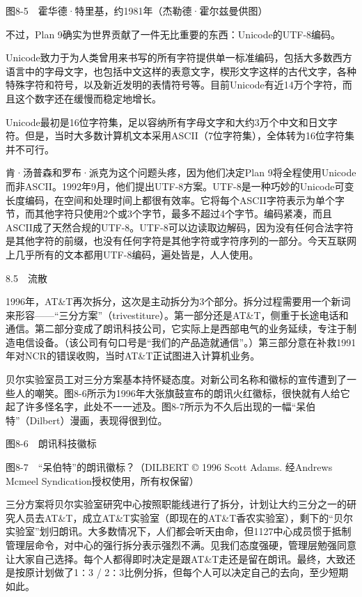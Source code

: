 \documentclass[a4paper,12pt,UTF8,twoside]{ctexbook}
\begin{document}
图8-5　霍华德·特里基，约1981年（杰勒德·霍尔兹曼供图）

不过，Plan 9确实为世界贡献了一件无比重要的东西：Unicode的UTF-8编码。

Unicode致力于为人类曾用来书写的所有字符提供单一标准编码，包括大多数西方语言中的字母文字，也包括中文这样的表意文字，楔形文字这样的古代文字，各种特殊字符和符号，以及新近发明的表情符号等。目前Unicode有近14万个字符，而且这个数字还在缓慢而稳定地增长。

Unicode最初是16位字符集，足以容纳所有字母文字和大约3万个中文和日文字符。但是，当时大多数计算机文本采用ASCII（7位字符集），全体转为16位字符集并不可行。

肯·汤普森和罗布·派克为这个问题头疼，因为他们决定Plan 9将全程使用Unicode而非ASCII。1992年9月，他们提出UTF-8方案。UTF-8是一种巧妙的Unicode可变长度编码，在空间和处理时间上都很有效率。它将每个ASCII字符表示为单个字节，而其他字符只使用2个或3个字节，最多不超过4个字节。编码紧凑，而且ASCII成了天然合规的UTF-8。UTF-8可以边读取边解码，因为没有任何合法字符是其他字符的前缀，也没有任何字符是其他字符或字符序列的一部分。今天互联网上几乎所有的文本都用UTF-8编码，遍处皆是，人人使用。





8.5　流散


1996年，AT\&T再次拆分，这次是主动拆分为3个部分。拆分过程需要用一个新词来形容——“三分方案”（trivestiture）。第一部分还是AT\&T，侧重于长途电话和通信。第二部分变成了朗讯科技公司，它实际上是西部电气的业务延续，专注于制造电信设备。（该公司有句口号是“我们的产品造就通信”。）第三部分意在补救1991年对NCR的错误收购，当时AT\&T正试图进入计算机业务。

贝尔实验室员工对三分方案基本持怀疑态度。对新公司名称和徽标的宣传遭到了一些人的嘲笑。图8-6所示为1996年大张旗鼓宣布的朗讯火红徽标，很快就有人给它起了许多怪名字，此处不一一述及。图8-7所示为不久后出现的一幅“呆伯特”（Dilbert）漫画，表现得很到位。



图8-6　朗讯科技徽标



图8-7　“呆伯特”的朗讯徽标？（DILBERT © 1996 Scott Adams. 经Andrews Mcmeel Syndication授权使用，所有权保留）

三分方案将贝尔实验室研究中心按照职能线进行了拆分，计划让大约三分之一的研究人员去AT\&T，成立AT\&T实验室（即现在的AT\&T香农实验室），剩下的“贝尔实验室”划归朗讯。大多数情况下，人们都会听天由命，但1127中心成员惯于抵制管理层命令，对中心的强行拆分表示强烈不满。见我们态度强硬，管理层勉强同意让大家自己选择。每个人都得即时决定是跟AT\&T走还是留在朗讯。最终，大致还是按原计划做了1∶3 / 2∶3比例分拆，但每个人可以决定自己的去向，至少短期如此。
\end{document}
